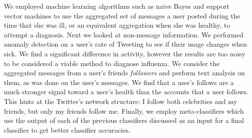 
We employed machine learning algorithms such as naive Bayes and support vector machines to use the aggregated set of messages a user posted during the time that she was ill, or an equivalent aggregation when she was healthy, to attempt a diagnosis. Next we looked at non-message information. We performed anomaly detection on a user's rate of Tweeting to see if their usage changes when sick. We find a significant difference in activity, however the results are too noisy to be considered a viable method to diagnose influenza. We consider the aggregated messages from a user's friends \emph{followers} and perform text analysis on them, as was done on the user's messages. We find that a user's follows are a much stronger signal toward a user's health than the accounts that a user follows. This hints at the Twitter's network structure: I follow both celebrities and my friends, but only my friends follow me. Finally, we employ meta-classifiers which use the output of each of the previous classifiers discussed as an input for a final classifier to get better classifier accuracies.





